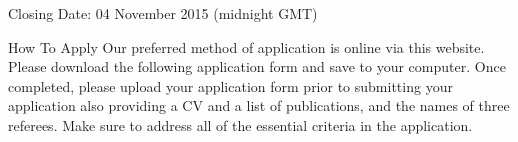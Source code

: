 Closing Date:
04 November 2015 (midnight GMT)

How To Apply
Our preferred method of application is online via this website. Please download the following application form and save to your computer. Once 
completed, please upload your application form prior to submitting your application also providing a CV and a list of publications, and the 
names of three referees. Make sure to address all of the essential criteria in the application.

